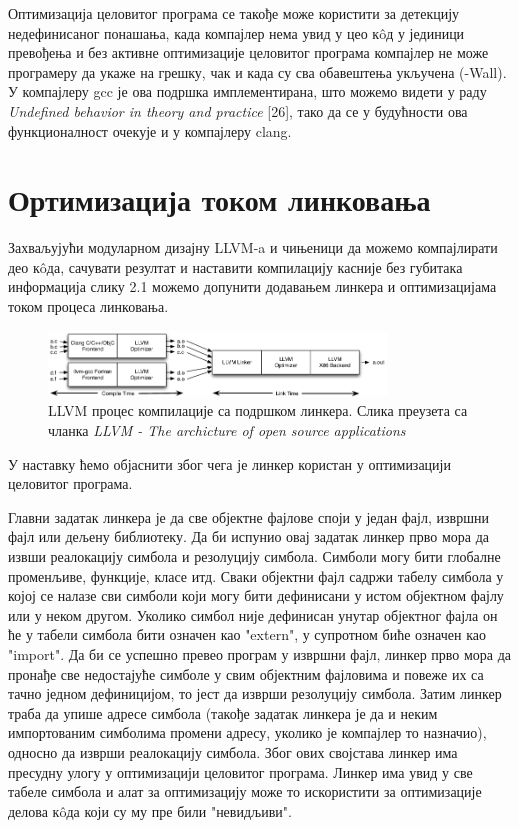 \documentclass[12pt,oneside]{memoir}
\begin{document}
Оптимизација целовитог програма се такође може користити за детекцију недефинисаног
понашања, када компајлер нема увид у цео к\^{o}д у јединици превођења и без
активне оптимизације целовитог програма компајлер не може програмеру да укаже
на грешку, чак и када су сва обавештења укључена (-Wall).
У компајлеру gcc је ова подршка имплементирана, што можемо видети у раду
\textit{Undefined behavior in theory and practice} [26], тако да се у будућности ова
функционалност очекује и у компајлеру clang.

\section{Ортимизација током линковања}


Захваљујући модуларном дизајну LLVM-a и чињеници да можемо компајлирати део к\^{o}да,
сачувати резултат и наставити компилацију касније без губитака информација
слику 2.1 можемо допунити додавањем линкера и оптимизацијама током процеса линковања.

\begin{figure}[!ht]
  \centering
  \includegraphics[width=0.8\textwidth]{LTO.png}
  \caption{LLVM процес компилације са подршком линкера. Слика преузета са чланка \textit{LLVM - The archicture of open source applications} }
  \label{fig:grafikon}
\end{figure}


У наставку ћемо објаснити због чега је линкер користан у оптимизацији целовитог програма.

Главни задатак линкера је да све објектне фајлове споји у један фајл, извршни фајл
или дељену библиотеку. 
Да би испунио овај задатак линкер прво мора да извши реалокацију симбола и резолуцију
симбола.
Симболи могу бити глобалне променљиве, функције, класе итд. 
Сваки објектни фајл садржи табелу симбола у којој се налазе сви симболи који 
могу бити дефинисани у истом објектном фајлу или у неком другом.
Уколико симбол није дефинисан унутар објектног фајла он ће у табели симбола бити
означен као "extern", у супротном биће означен као "import".
Да би се успешно превео програм у извршни фајл, линкер прво мора да пронађе све 
недостајуће симболе у свим објектним фајловима и повеже их са тачно једном дефиницијом, то јест да изврши резолуцију симбола.
Затим линкер траба да упише адресе симбола (такође задатак
линкера је да и неким импортованим симболима промени адресу, уколико је компајлер то назначио), односно да изврши реалокацију симбола.
Због ових својстава линкер има пресудну улогу у оптимизацији целовитог програма.
Линкер 
има увид у све табеле симбола и алат за оптимизацију може то искористити за оптимизације
делова к\^{o}да који су му пре били "невидљиви". 
\end{document}
